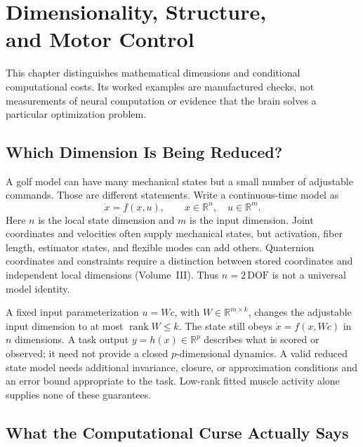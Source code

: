 \chapter[Dimensionality and Control]{Dimensionality, Structure,\\and Motor Control}
\label{ch:curse-dim}

\begin{gomdraftnotice}
This chapter distinguishes mathematical dimensions and conditional computational
costs. Its worked examples are manufactured checks, not measurements of neural
computation or evidence that the brain solves a particular optimization problem.
\end{gomdraftnotice}

\section{Which Dimension Is Being Reduced?}

A golf model can have many mechanical states but a small number of adjustable
commands. Those are different statements. Write a continuous-time model as
\begin{equation}
  \dot x=f(x,u),\qquad x\in\mathbb R^n,\quad u\in\mathbb R^m.
\end{equation}
Here $n$ is the local state dimension and $m$ is the input dimension. Joint
coordinates and velocities often supply mechanical states, but activation,
fiber length, estimator states, and flexible modes can add others. Quaternion
coordinates and constraints require a distinction between stored coordinates
and independent local dimensions (Volume~III). Thus $n=2\,\mathrm{DOF}$ is not
a universal model identity.

A fixed input parameterization $u=Wc$, with $W\in\mathbb R^{m\times k}$,
changes the adjustable input dimension to at most $\operatorname{rank}W\le k$.
The state still obeys $\dot x=f(x,Wc)$ in $n$ dimensions. A task output
$y=h(x)\in\mathbb R^p$ describes what is scored or observed; it need not
provide a closed $p$-dimensional dynamics. A valid reduced state model needs
additional invariance, closure, or approximation conditions and an error
bound appropriate to the task. Low-rank fitted muscle activity alone supplies
none of these guarantees.

\section{What the Computational Curse Actually Says}

